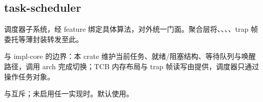 
\subsection{task-scheduler}

调度器子系统，经 feature 绑定具体算法，对外统一门面。聚合层将、、、、trap 帧委托等薄封装转发至此。

与 impl-core 的边界：本 crate 维护当前任务、就绪/阻塞结构、等待队列与唤醒路径，调用 arch 完成切换；TCB 内存布局与 trap 帧读写由提供，调度器只通过操作任务对象。

与互斥；未启用任一实现时。默认使用。




